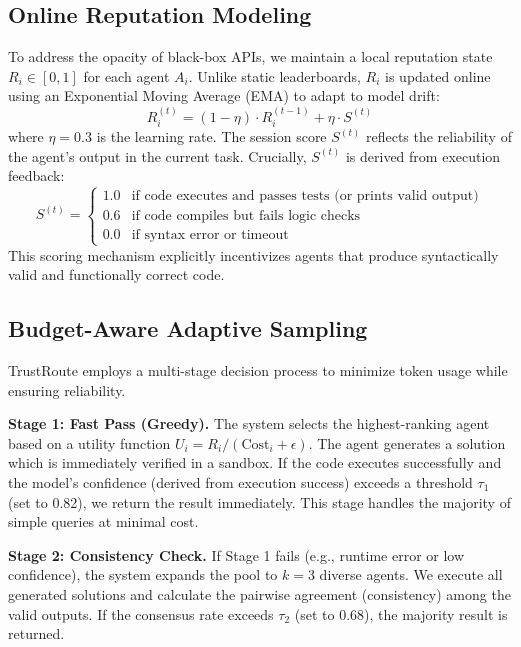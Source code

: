 \documentclass[acmsmall,screen,review,anonymous]{acmart}
\begin{document}
\subsection{Online Reputation Modeling}
To address the opacity of black-box APIs, we maintain a local reputation state $R_i \in [0, 1]$ for each agent $A_i$. Unlike static leaderboards, $R_i$ is updated online using an Exponential Moving Average (EMA) to adapt to model drift:
\begin{equation}
    R_i^{(t)} = (1 - \eta) \cdot R_i^{(t-1)} + \eta \cdot S^{(t)}
\end{equation}
where $\eta=0.3$ is the learning rate. The session score $S^{(t)}$ reflects the reliability of the agent's output in the current task. Crucially, $S^{(t)}$ is derived from execution feedback:
\begin{equation}
    S^{(t)} = 
    \begin{cases} 
    1.0 & \text{if code executes and passes tests (or prints valid output)} \\
    0.6 & \text{if code compiles but fails logic checks} \\
    0.0 & \text{if syntax error or timeout} 
    \end{cases}
\end{equation}
This scoring mechanism explicitly incentivizes agents that produce syntactically valid and functionally correct code.

\subsection{Budget-Aware Adaptive Sampling}
TrustRoute employs a multi-stage decision process to minimize token usage while ensuring reliability.

\textbf{Stage 1: Fast Pass (Greedy).} The system selects the highest-ranking agent based on a utility function $U_i = R_i / (\text{Cost}_i + \epsilon)$. The agent generates a solution which is immediately verified in a sandbox. If the code executes successfully and the model's confidence (derived from execution success) exceeds a threshold $\tau_1$ (set to 0.82), we return the result immediately. This stage handles the majority of simple queries at minimal cost.

\textbf{Stage 2: Consistency Check.} If Stage 1 fails (e.g., runtime error or low confidence), the system expands the pool to $k=3$ diverse agents. We execute all generated solutions and calculate the pairwise agreement (consistency) among the valid outputs. If the consensus rate exceeds $\tau_2$ (set to 0.68), the majority result is returned.
\end{document}
